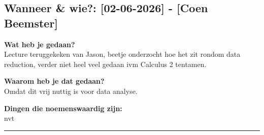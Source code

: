 \subsection*{Wanneer \& wie?: [02-06-2026] - [Coen Beemster]}

\textbf{Wat heb je gedaan?}\\
Lecture teruggekeken van Jason, beetje onderzocht hoe het zit rondom data reduction, verder niet heel veel gedaan ivm Calculus 2 tentamen.
\vspace{0.3cm} 

\noindent \textbf{Waarom heb je dat gedaan?}\\
Omdat dit vrij nuttig is voor data analyse.

\noindent \textbf{Dingen die noemenswaardig zijn:}\\
nvt


\vspace{0.5cm}
\hrule 
\vspace{0.5cm}
